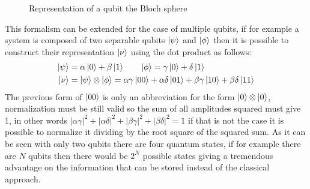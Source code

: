 \begin{figure}[!ht]
	\centering
	\caption[The bloch sphere]{Representation of a qubit the Bloch sphere}
	\label{bloch sphere}
\end{figure}
This formalism can be extended  for the case of multiple qubits, if for example a system is composed of two separable qubits $\ket{\psi}$ and $\ket{\phi}$ then it is possible to construct their representation $\ket{\nu}$ using the dot product as follows:
\begin{align*}
	\ket{\psi} &= \alpha \ket{0} + \beta \ket{1} \qquad
	\ket{\phi} = \gamma \ket{0} + \delta \ket{1}\\
	\ket{\nu} &= \ket{\psi} \otimes \ket{\phi} = \alpha\gamma \ket{00} + \alpha\delta \ket{01} + \beta\gamma \ket{10} + \beta\delta\ket{11}
\end{align*}
The previous form of $\ket{00}$ is only an abbreviation for the form $\ket{0} \otimes \ket{0}$,
normalization must be still valid so the sum of all amplitudes squared must give 1, in other words $|\alpha\gamma|^2  + |\alpha\delta|^2  + |\beta\gamma|^2  + |\beta\delta|^2 = 1$ if that is not the case it is possible to normalize it dividing by the root square of the squared sum. As it can be seen with only two qubits there are four quantum states, if for example there are $N$ qubits then there would be $2^N$ possible states giving a tremendous advantage on the information that can be stored instead of the classical approach.
